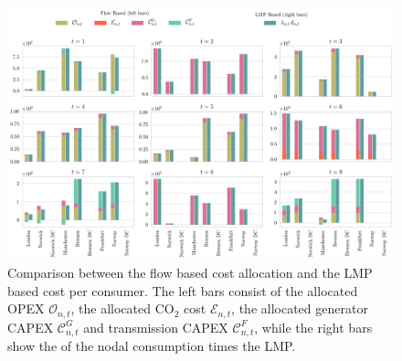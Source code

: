 \documentclass[11pt]{article}
\newcommand{\allocateCapexGeneration}[1][n]{\mathcal{C}^{G}_{#1,t}}
\newcommand{\allocateCapexFlow}[1][n]{\mathcal{C}^{F}_{#1,t}}
\newcommand{\allocateOpex}[1][n]{\mathcal{O}_{#1,t}}
\newcommand{\allocateEmissionCost}[1][n]{\mathcal{E}_{#1,t}}
\begin{document}
\begin{figure}[h]
    \centering
    \includegraphics[width=\textwidth]{compare_allocation.png}
    \caption{Comparison between the flow based cost allocation and the LMP based cost per consumer. The left bars consist of the allocated OPEX $\allocateOpex$, the allocated CO$_2$ cost $\allocateEmissionCost$, the allocated generator CAPEX $\allocateCapexGeneration$ and transmission CAPEX $\allocateCapexFlow$, while the right bars show the of the nodal consumption times the LMP. }
    \label{fig:cost_allocation}
\end{figure}
\end{document}
